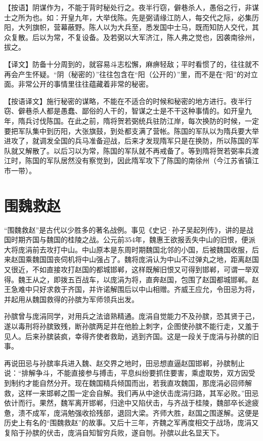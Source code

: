 \documentclass[12pt,UTF8]{ctexbook}
\begin{document}
【按语】阴谋作为，不能于背时秘处行之。夜半行窃，僻巷杀人，愚俗之行，非谋士之所为也。如：开皇九年，大举伐陈。先是弼请缘江防人，每交代之际，必集历阳，大列旗帜，营幕蔽野。陈人以为大兵至，悉发国中士马，既而知防人交代，其众复散。后以为常，不复设备。及若弼以大军济江，陈人弗之觉也，因袭南徐州，拔之。

【译文】防备十分周到的，就容易斗志松懈，麻痹轻敌；平时看惯了的，往往就不再会产生怀疑。“阴（秘密的）”往往包含在“阳（公开的）”里，而不是在“阳”的对立面。非常公开的事情里往往蕴藏着非常的秘密。

【按语译文】施行秘密的谋略，不能在不适合的时候和秘密的地方进行。夜半行窃、僻巷杀人都是愚蠢、鄙俗的人干的，智谋之士是不干这种事情的。如开皇九年，隋兵讨伐陈国。在此之前，隋将贺若弼统兵驻防江岸，每次换防的时候，一定要把军队集中到历阳，大张旗鼓，到处都支满了营帐。陈国的军队以为隋兵要大举进攻了，就调发全国的兵马准备迎战，后来才发现隋军只是在换防，所以陈国的军队就又解散了。以后习以为常，陈国的军队就不再戒备了。等到隋将贺若弼率兵渡江时，陈国的军队居然没有察觉到，因此隋军攻下了陈国的南徐州（今江苏省镇江市一带）。

\chapter{围魏救赵}

“围魏救赵”是古代以少胜多的著名战例。事见《史记·孙子吴起列传》，讲的是战国时期齐国与魏国的桂陵之战。公元前354年，魏惠王欲报丢失中山的旧恨，便派大将庞涓前去攻打中山。中山原本是东周时期魏国北邻的小国，后被魏国收服，后来赵国乘魏国国丧伺机将中山强占了。魏将庞涓认为中山不过弹丸之地，距离赵国又很近，不如直接攻打赵国的都城邯郸，这样既解旧恨又可得到邯郸，可谓一举双得。魏王从之，即拨五百战车，以庞涓为将，直奔赵国，包围了赵国都城邯郸。赵王急难中只好求救于齐国，并许诺解围后以中山相赠。齐威王应允，令田忌为将，并起用从魏国救得的孙膑为军师领兵出发。

孙膑曾与庞涓同学，对用兵之法谙熟精通。庞涓自觉能力不及孙膑，恐其贤于己，遂以毒刑将孙膑致残，断孙膑两足并在他脸上刺字，企图使孙膑不能行走，又羞于见人。后来孙膑装疯，幸得齐使者救助，逃到齐国。这是一段关于庞涓与孙膑的旧事。

再说田忌与孙膑率兵进入魏、赵交界之地时，田忌想直逼赵国邯郸，孙膑制止说：“排解争斗，不能直接参与搏击，平息纠纷要抓住要害，乘虚取势，双方因受到制约才能自然分开。现在魏国精兵倾国而出，若我直攻魏国，那庞涓必回师解救，这样一来邯郸之围一定会自解。我们再从中途伏击庞涓归路，其军必败。”田忌依计而行。果然，魏军离开邯郸，归途中又陷伏击，与齐战于桂陵，魏部卒长途疲惫，溃不成军，庞涓勉强收拾残部，退回大梁。齐师大胜，赵国之围遂解。这便是历史上有名的“围魏救赵”的故事。又后十三年，齐魏之军再度相交于战场，庞涓又复陷于孙膑的伏击，庞涓自知智穷兵败，遂自刎。孙膑以此名显天下。
\end{document}
